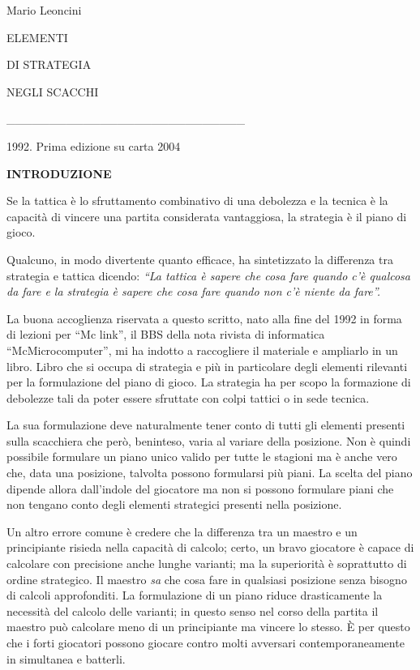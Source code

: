 \documentclass[
]{article}
\author{}
\date{}
\begin{document}


  Mario Leoncini

ELEMENTI

DI STRATEGIA

NEGLI SCACCHI

\_\_\_\_\_\_\_\_\_\_\_\_\_\_\_\_\_\_\_\_\_\_\_\_\_\_\_\_

1992. Prima edizione su carta 2004

\textbf{INTRODUZIONE}

Se la tattica è lo sfruttamento combinativo di una debolezza e la
tecnica è la capacità di vincere una partita considerata vantaggiosa, la
strategia è il piano di gioco.

Qualcuno, in modo divertente quanto efficace, ha sintetizzato la
differenza tra strategia e tattica dicendo: \emph{``La tattica è sapere
che cosa fare quando c'è qualcosa da fare e la strategia è sapere che
cosa fare quando non c'è niente da fare''.}

La buona accoglienza riservata a questo scritto, nato alla fine del 1992
in forma di lezioni per ``Mc link'', il BBS della nota rivista di
informatica ``McMicrocomputer'', mi ha indotto a raccogliere il
materiale e ampliarlo in un libro. Libro che si occupa di strategia e
più in particolare degli elementi rilevanti per la formulazione del
piano di gioco. La strategia ha per scopo la formazione di debolezze
tali da poter essere sfruttate con colpi tattici o in sede tecnica.

La sua formulazione deve naturalmente tener conto di tutti gli elementi
presenti sulla scacchiera che però, beninteso, varia al variare della
posizione. Non è quindi possibile formulare un piano unico valido per
tutte le stagioni ma è anche vero che, data una posizione, talvolta
possono formularsi più piani. La scelta del piano dipende allora
dall'indole del giocatore ma non si possono formulare piani che non
tengano conto degli elementi strategici presenti nella posizione.

Un altro errore comune è credere che la differenza tra un maestro e un
principiante risieda nella capacità di calcolo; certo, un bravo
giocatore è capace di calcolare con precisione anche lunghe varianti; ma
la superiorità è soprattutto di ordine strategico. Il maestro \emph{sa}
che cosa fare in qualsiasi posizione senza bisogno di calcoli
approfonditi. La formulazione di un piano riduce drasticamente la
necessità del calcolo delle varianti; in questo senso nel corso della
partita il maestro può calcolare meno di un principiante ma vincere lo
stesso. È per questo che i forti giocatori possono giocare contro molti
avversari contemporaneamente in simultanea e batterli.
\end{document}
